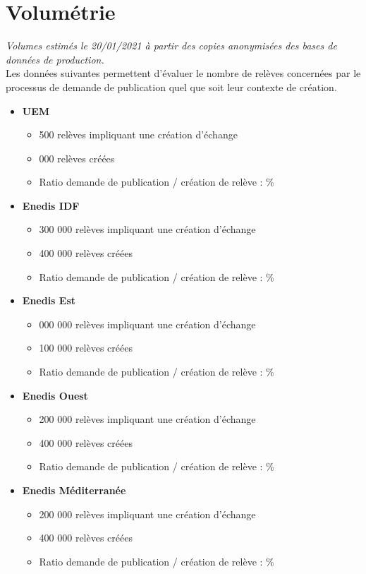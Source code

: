 \documentclass[a4paper, 12pt]{report}
\begin{document}
\chapter{Volumétrie}
\label{appendix:volumetrie}

\textit{Volumes estimés le 20/01/2021 à partir des copies anonymisées des bases de données de production.}\\

Les données suivantes permettent d'évaluer le nombre de relèves concernées par le processus de demande de publication quel que soit leur contexte de création.\\

\begin{itemize}
  \item \textbf{UEM}
  \begin{itemize}
    \item \approx{} 500 relèves impliquant une création d'échange
    \item \approx{} 000 relèves créées
    \item Ratio demande de publication / création de relève : \approx{}\%
  \end{itemize}
  \item \textbf{Enedis IDF}
  \begin{itemize}
    \item \approx{} 300 000 relèves impliquant une création d'échange
    \item \approx{} 400 000 relèves créées
    \item Ratio demande de publication / création de relève : \approx{}\%
  \end{itemize}
  \item \textbf{Enedis Est}
  \begin{itemize}
    \item \approx{} 000 000 relèves impliquant une création d'échange
    \item \approx{} 100 000 relèves créées
    \item Ratio demande de publication / création de relève : \approx{}\%
  \end{itemize}
  \item \textbf{Enedis Ouest}
  \begin{itemize}
    \item \approx{} 200 000 relèves impliquant une création d'échange
    \item \approx{} 400 000 relèves créées
    \item Ratio demande de publication / création de relève : \approx{}\%
  \end{itemize}
  \item \textbf{Enedis Méditerranée}
  \begin{itemize}
    \item \approx{} 200 000 relèves impliquant une création d'échange
    \item \approx{} 400 000 relèves créées
    \item Ratio demande de publication / création de relève : \approx{}\%
  \end{itemize}
\end{itemize}
\clearpage
\end{document}
